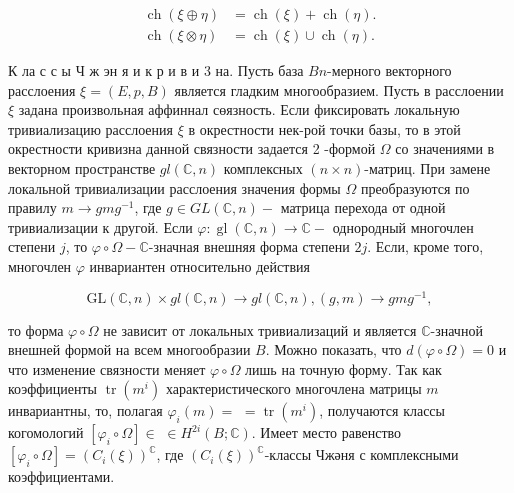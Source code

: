 \documentclass[10pt]{article}
\begin{document}
\[

\begin{aligned}

\operatorname{ch}(\xi \oplus \eta) & =\operatorname{ch}(\xi)+\operatorname{ch}(\eta) . \\

\operatorname{ch}(\xi \otimes \eta) & =\operatorname{ch}(\xi) \cup \operatorname{ch}(\eta) .

\end{aligned}

\]



К ла с с ы Ч ж эн я и к р и в и 3 на. Пусть база $B n$-мерного векторного расслоения $\xi=(E, p, B)$ является гладким многообразием. Пусть в расслоении $\xi$ задана произвольная аффиннал сөязность. Если фиксировать локальную тривиализацию расслоения $\xi$ в окрестности нек-рой точки базы, то в этой окрестности кривизна данной связности задается 2 -формой $\Omega$ со значениями в векторном пространстве $g l(\mathbb{C}, n)$ комплексных $(n \times n)$-матриц. При замене локальной тривиализации расслоения значения формы $\Omega$ преобразуются по правилу $m \rightarrow g m g^{-1}$, где $g \in G L(\mathbb{C}, n)-$ матрица перехода от одной тривиализации к другой. Если $\varphi: \operatorname{gl}(\mathbb{C}, n) \rightarrow \mathbb{C}-$ однородный многочлен степени $j$, то $\varphi \circ \Omega-\mathbb{C}$-значная внешняя форма степени $2 j$. Если, кроме того, многочлен $\varphi$ инвариантен относительно действия



\[

\mathrm{GL}(\mathbb{C}, n) \times g l(\mathbb{C}, n) \longrightarrow g l(\mathbb{C}, n),(g, m) \longrightarrow g m g^{-1},

\]



то форма $\varphi \circ \Omega$ не зависит от локальных тривиализаций и является $\mathbb{C}$-значной внешней формой на всем многообразии $B$. Можно показать, что $d(\varphi \circ \Omega)=0$ и что изменение связности меняет $\varphi \circ \Omega$ лишь на точную форму. Так как коэффициенты $\operatorname{tr}\left(m^{i}\right)$ характеристического многочлена матрицы $m$ инвариантны, то, полагая $\varphi_{i}(m)=$ $=\operatorname{tr}\left(m^{i}\right)$, получаются классы когомологий $\left[\varphi_{i} \circ \Omega\right] \in$ $\in H^{2 i}(B ; \mathbb{C})$. Имеет место равенство $\left[\varphi_{i} \circ \Omega\right]=\left(C_{i}(\xi)\right)^{\mathbb{C}}$, где $\left(C_{i}(\xi)\right)^{\mathbb{C}}$-классы Чжәня с комплексными коэффициентами.
\end{document}

